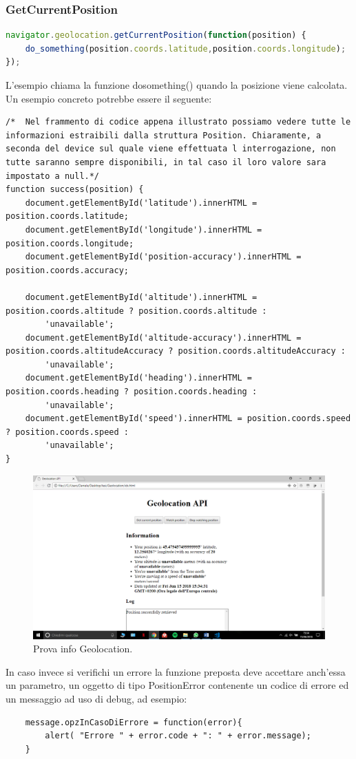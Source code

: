 \documentclass[italian]{article}
\begin{document}
\subsubsection{GetCurrentPosition}
\begin{lstlisting}[language=JavaScript]
navigator.geolocation.getCurrentPosition(function(position) {
	do_something(position.coords.latitude,position.coords.longitude);
});
\end{lstlisting}
L'esempio chiama la funzione dosomething() quando la posizione viene calcolata. Un esempio concreto potrebbe essere il seguente:
\pagebreak
\begin{lstlisting}
/*	Nel frammento di codice appena illustrato possiamo vedere tutte le informazioni estraibili dalla struttura Position. Chiaramente, a seconda del device sul quale viene effettuata l interrogazione, non tutte saranno sempre disponibili, in tal caso il loro valore sara impostato a null.*/
function success(position) {
	document.getElementById('latitude').innerHTML = position.coords.latitude;
	document.getElementById('longitude').innerHTML = position.coords.longitude;
	document.getElementById('position-accuracy').innerHTML = position.coords.accuracy;
	
	document.getElementById('altitude').innerHTML = position.coords.altitude ? position.coords.altitude :
		'unavailable';
	document.getElementById('altitude-accuracy').innerHTML = position.coords.altitudeAccuracy ? position.coords.altitudeAccuracy :
		'unavailable';
	document.getElementById('heading').innerHTML = position.coords.heading ? position.coords.heading :
		'unavailable';
	document.getElementById('speed').innerHTML = position.coords.speed ? position.coords.speed :
		'unavailable';
}
\end{lstlisting}
\begin{figure}[h]
	\centering
	\includegraphics[width=1\linewidth]{img}
	\caption{Prova info Geolocation.}
	\label{fig:Info Geolocation}
\end{figure}
In caso invece si verifichi un errore la funzione preposta deve accettare anch’essa un parametro, un oggetto di tipo PositionError  contenente un codice di errore ed un messaggio ad uso di debug, ad esempio:
\begin{lstlisting}
	message.opzInCasoDiErrore = function(error){ 
		alert( "Errore " + error.code + ": " + error.message);
	}
\end{lstlisting}
\end{document}
